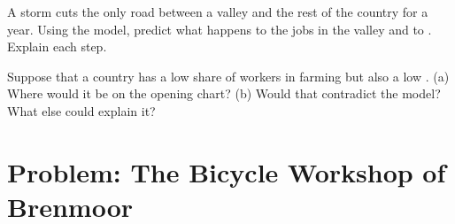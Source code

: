 \begin{exercise}[$\star\star\star$]\label{exo:g7:specialisation:11}
A storm cuts the only road between a valley and the rest of the country for a year.
Using the model, predict what happens to the jobs in the valley and to . Explain each step.
\end{exercise}

\begin{exercise}[$\star\star\star$]\label{exo:g7:specialisation:12}
Suppose that a country has a low share of workers in farming but also a low . (a) Where would it be on the opening chart? (b) Would that contradict the
model? What else could explain it?
\end{exercise}

\section{Problem: The Bicycle Workshop of Brenmoor}


